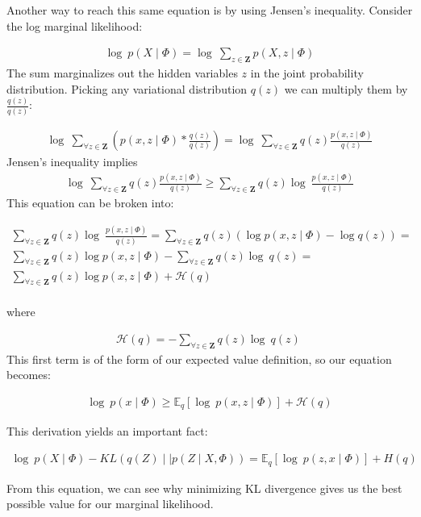 Another way to reach this same equation is by using Jensen's inequality. Consider the log marginal likelihood:

\begin{align}\log\ p(X\mid \Phi) = \log\ \sum\limits_{z \in \mathbf{Z}} p(X,z\mid \Phi)\end{align}
The sum marginalizes out the hidden variables $z$ in the joint probability distribution. Picking any variational distribution $q(z)$ we can multiply them by $\frac{q(z)}{q(z)}$:


\begin{align} \log\ \sum\limits_{\forall z \in \mathbf{Z}} ( p(x,z\mid \Phi) * \frac{q(z)}{q(z)} ) = \log\ \sum\limits_{\forall z \in \mathbf{Z}} q(z) \frac{ p(x,z\mid \Phi) }{q(z)}\end{align}
Jensen's inequality implies
\begin{align}\log\ \sum\limits_{\forall z \in \mathbf{Z}} q(z) \frac{p(x,z\mid \Phi) }{q(z)}  \geq \sum\limits_{\forall z \in \mathbf{Z}} q(z) \log\ \frac{ p(x,z\mid \Phi) }{q(z)} \end{align}
This equation can be broken into: 

\begin{align}
\nonumber \sum\limits_{\forall z \in \mathbf{Z}} q(z) \log\ \frac{ p(x,z\mid \Phi) }{q(z)}= \sum\limits_{\forall z \in \mathbf{Z}} q(z) (\log p(x,z\mid \Phi) - \log q(z)) = \\
 \nonumber \sum\limits_{\forall z \in \mathbf{Z}} q(z) \log p(x,z\mid \Phi) - \sum\limits_{\forall z \in \mathbf{Z}}  q(z)\log\ q(z) =  \\
 \sum\limits_{\forall z \in \mathbf{Z}} q(z) \log p(x,z\mid \Phi) + \mathcal{H}(q)\\
\end{align}

where 

\begin{align}
\mathcal{H}(q) =  - \sum\limits_{\forall z \in \mathbf{Z}}  q(z)\log\ q(z) \
\end{align} \citep{blei:2017} This first term is of the form of our expected value definition, so our equation becomes:


\begin{align} \log\ p(x\mid \Phi) \geq \mathbb{E}_q[\log\ p(x,z\mid \Phi)] + \mathcal{H}(q) \end{align}


This derivation yields an important fact: 

\begin{align}
\log\ p(X\mid \Phi) - KL(q(Z) \mid \mid  p(Z\mid X, \Phi)) = \mathbb{E}_q[\log\ p(z,x \mid  \Phi)] + H(q) \end{align}

From this equation, we can see why minimizing KL divergence gives us the best possible value for our marginal likelihood.



